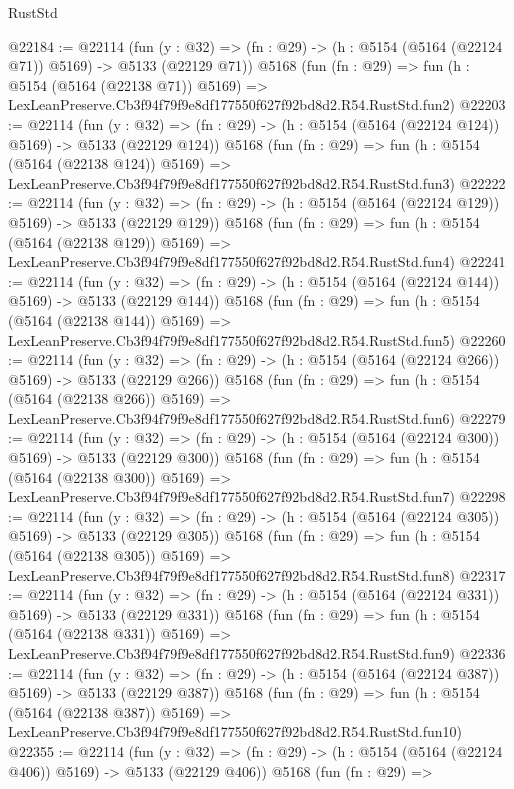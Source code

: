 \begin{lexlean}{RustStd}
\begin{coremodule}
@22184 := @22114
    (fun (y : @32) => (fn : @29) -> (h : @5154 (@5164 (@22124 @71)) @5169) -> @5133 (@22129 @71))
    @5168
    (fun (fn : @29) =>
    fun (h : @5154 (@5164 (@22138 @71)) @5169) =>
    LexLeanPreserve.Cb3f94f79f9e8df177550f627f92bd8d2.R54.RustStd.fun2)
@22203 := @22114
    (fun (y : @32) => (fn : @29) -> (h : @5154 (@5164 (@22124 @124)) @5169) -> @5133 (@22129 @124))
    @5168
    (fun (fn : @29) =>
    fun (h : @5154 (@5164 (@22138 @124)) @5169) =>
    LexLeanPreserve.Cb3f94f79f9e8df177550f627f92bd8d2.R54.RustStd.fun3)
@22222 := @22114
    (fun (y : @32) => (fn : @29) -> (h : @5154 (@5164 (@22124 @129)) @5169) -> @5133 (@22129 @129))
    @5168
    (fun (fn : @29) =>
    fun (h : @5154 (@5164 (@22138 @129)) @5169) =>
    LexLeanPreserve.Cb3f94f79f9e8df177550f627f92bd8d2.R54.RustStd.fun4)
@22241 := @22114
    (fun (y : @32) => (fn : @29) -> (h : @5154 (@5164 (@22124 @144)) @5169) -> @5133 (@22129 @144))
    @5168
    (fun (fn : @29) =>
    fun (h : @5154 (@5164 (@22138 @144)) @5169) =>
    LexLeanPreserve.Cb3f94f79f9e8df177550f627f92bd8d2.R54.RustStd.fun5)
@22260 := @22114
    (fun (y : @32) => (fn : @29) -> (h : @5154 (@5164 (@22124 @266)) @5169) -> @5133 (@22129 @266))
    @5168
    (fun (fn : @29) =>
    fun (h : @5154 (@5164 (@22138 @266)) @5169) =>
    LexLeanPreserve.Cb3f94f79f9e8df177550f627f92bd8d2.R54.RustStd.fun6)
@22279 := @22114
    (fun (y : @32) => (fn : @29) -> (h : @5154 (@5164 (@22124 @300)) @5169) -> @5133 (@22129 @300))
    @5168
    (fun (fn : @29) =>
    fun (h : @5154 (@5164 (@22138 @300)) @5169) =>
    LexLeanPreserve.Cb3f94f79f9e8df177550f627f92bd8d2.R54.RustStd.fun7)
@22298 := @22114
    (fun (y : @32) => (fn : @29) -> (h : @5154 (@5164 (@22124 @305)) @5169) -> @5133 (@22129 @305))
    @5168
    (fun (fn : @29) =>
    fun (h : @5154 (@5164 (@22138 @305)) @5169) =>
    LexLeanPreserve.Cb3f94f79f9e8df177550f627f92bd8d2.R54.RustStd.fun8)
@22317 := @22114
    (fun (y : @32) => (fn : @29) -> (h : @5154 (@5164 (@22124 @331)) @5169) -> @5133 (@22129 @331))
    @5168
    (fun (fn : @29) =>
    fun (h : @5154 (@5164 (@22138 @331)) @5169) =>
    LexLeanPreserve.Cb3f94f79f9e8df177550f627f92bd8d2.R54.RustStd.fun9)
@22336 := @22114
    (fun (y : @32) => (fn : @29) -> (h : @5154 (@5164 (@22124 @387)) @5169) -> @5133 (@22129 @387))
    @5168
    (fun (fn : @29) =>
    fun (h : @5154 (@5164 (@22138 @387)) @5169) =>
    LexLeanPreserve.Cb3f94f79f9e8df177550f627f92bd8d2.R54.RustStd.fun10)
@22355 := @22114
    (fun (y : @32) => (fn : @29) -> (h : @5154 (@5164 (@22124 @406)) @5169) -> @5133 (@22129 @406))
    @5168
    (fun (fn : @29) =>

\end{coremodule}
\end{lexlean}
